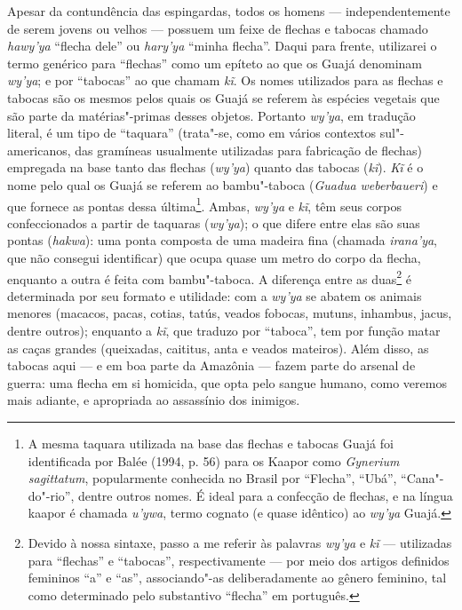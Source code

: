 Apesar da contundência das espingardas, todos os homens ---
independentemente de serem jovens ou velhos --- possuem um feixe de
flechas e tabocas chamado \emph{hawy'ya} ``flecha dele'' ou
\emph{hary'ya} ``minha flecha''. Daqui para frente, utilizarei o termo
genérico para ``flechas'' como um epíteto ao que os Guajá denominam
\emph{wy'ya}; e por ``tabocas'' ao que chamam \emph{kĩ}. Os nomes
utilizados para as flechas e tabocas são os mesmos pelos quais os Guajá
se referem às espécies vegetais que são parte da matérias"-primas desses
objetos. Portanto \emph{wy'ya}, em tradução literal, é um tipo de
``taquara'' (trata"-se, como em vários contextos sul"-americanos, das
gramíneas usualmente utilizadas para fabricação de flechas) empregada na
base tanto das flechas (\emph{wy'ya}) quanto das tabocas (\emph{kĩ}).
\emph{Kĩ} é o nome pelo qual os Guajá se referem ao bambu"-taboca
(\emph{Guadua} \emph{weberbaueri}) e que fornece as pontas dessa
última\footnote{A mesma taquara utilizada na base das flechas e tabocas
  Guajá foi identificada por Balée (1994, p. 56) para os Kaapor como
  \emph{Gynerium} \emph{sagittatum}, popularmente conhecida no Brasil
  por ``Flecha'', ``Ubá'', ``Cana"-do"-rio'', dentre outros nomes. É ideal para
  a confecção de flechas, e na língua kaapor é chamada \emph{u'ywa},
  termo cognato (e quase idêntico) ao \emph{wy'ya} Guajá.}. Ambas,
\emph{wy'ya} e \emph{kĩ}, têm seus corpos confeccionados a partir de
taquaras (\emph{wy'ya}); o que difere entre elas são suas pontas
(\emph{hakwa}): uma ponta composta de uma madeira fina (chamada
\emph{irana'ya}, que não consegui identificar) que ocupa quase um metro
do corpo da flecha, enquanto a outra é feita com bambu"-taboca. A
diferença entre as duas\footnote{Devido à nossa sintaxe, passo a me
  referir às palavras \emph{wy'ya} e \emph{kĩ} --- utilizadas para
  ``flechas'' e ``tabocas'', respectivamente --- por meio dos artigos
  definidos femininos ``a'' e ``as'', associando"-as deliberadamente ao
  gênero feminino, tal como determinado pelo substantivo ``flecha'' em
  português.} é determinada por seu formato e utilidade: com a
\emph{wy'ya} se abatem os animais menores (macacos, pacas, cotias,
tatús, veados fobocas, mutuns, inhambus, jacus, dentre outros); enquanto
a \emph{kĩ}, que traduzo por ``taboca'', tem por função matar as caças
grandes (queixadas, caititus, anta e veados mateiros). Além disso, as
tabocas aqui --- e em boa parte da Amazônia --- fazem parte do arsenal de
guerra: uma flecha em si homicida, que opta pelo sangue humano, como
veremos mais adiante, e apropriada ao assassínio dos inimigos.

